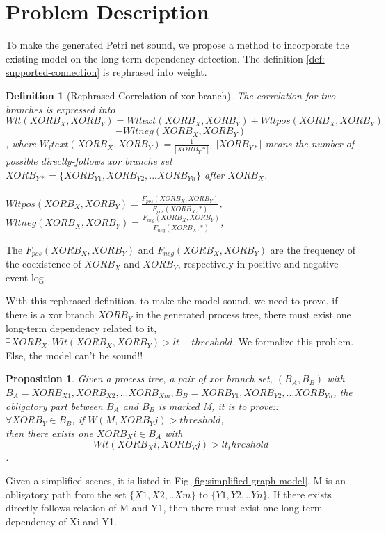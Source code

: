 \documentclass[]{article}
\newtheorem{mydef}{Definition}[section]
\newtheorem{myproposition}{Proposition}[section]
\begin{document}
\section{Problem Description}
To make the generated Petri net sound, we propose a method to incorporate the existing model on the long-term dependency detection. The definition \ref{def: supported-connection} is rephrased into weight. 
\begin{mydef}[Rephrased Correlation of xor branch] The correlation for two branches is expressed into
	\[Wlt(XORB_X,XORB_Y)= Wlt{ext}(XORB_X, XORB_Y) + Wlt{pos}(XORB_X, XORB_Y)\] \[ -Wlt{neg}(XORB_X, XORB_Y)\], where 
	$W_lt{ext}(XORB_X, XORB_Y)= \frac{1}{|XORB_Y*|}$, $|XORB_{Y*}|$ means the number of possible  directly-follows xor branche set $XORB_{Y*}=\{XORB_{Y1}, XORB_{Y2},...XORB_{Yn} \}$ after $XORB_X$. \\ \\
	$Wlt{pos}(XORB_X, XORB_Y)= \frac{F_{pos}(XORB_X, XORB_Y)}{F_{pos}(XORB_X, *)}$, \\
	$Wlt{neg}(XORB_X, XORB_Y)= \frac{F_{neg}(XORB_X, XORB_Y)}{F_{neg}(XORB_X, *)}$, \\	
\end{mydef}
The $F_{pos}(XORB_X, XORB_Y)$ and $F_{neg}(XORB_X, XORB_Y)$ are the frequency of the coexistence of $XORB_X$ and $XORB_Y$, respectively in positive and negative event log.

With this rephrased definition, to make the model sound, we need to prove, if there is a xor branch $XORB_Y$ in the generated process tree, there must exist one long-term dependency related to it, $\exists XORB_X, Wlt(XORB_X,XORB_Y) > lt-threshold$. We formalize this problem. Else, the model can't be sound!!
\begin{myproposition}
	Given a process tree, a pair of xor branch set, $(B_A,B_B)$ with $B_A={XORB_{X1}, XORB_{X2},...XORB_{Xm}}, B_B={XORB_{Y1}, XORB_{Y2},...XORB_{Yn}}$, the obligatory part between $B_A$ and $B_B$ is marked M, it is to prove:: \\
	$\forall XORB_Y \in B_B$, if $W(M, XORB_Yj) > threshold$, \\ then there exists one $XORB_Xi \in B_A$ with 
	\[Wlt(XORB_Xi, XORB_Yj)> lt_threshold\]. 
\end{myproposition}
Given a simplified scenes, it is listed in Fig \ref{fig:simplified-graph-model}. M is an obligatory path from the set $\{X1,X2,..Xm\}$ to $\{Y1,Y2,..Yn\}$. If there exists directly-follows relation of M and Y1, then there must exist one long-term dependency of Xi and Y1. 
\end{document}
